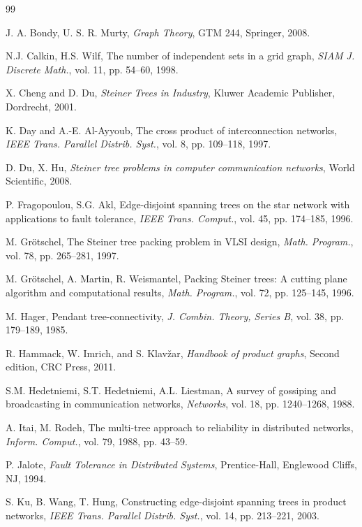 \documentclass[final]{dmtcs-episciences}
\begin{document}
\begin{thebibliography}{99}


J. A. Bondy, U. S. R. Murty, \emph{Graph Theory}, GTM 244, Springer,
2008.

N.J. Calkin, H.S. Wilf, The number of independent sets in a grid
graph, \emph{SIAM J. Discrete Math.}, vol. 11, pp. 54--60, 1998.

X. Cheng and D. Du, \emph{Steiner Trees in Industry}, Kluwer
Academic Publisher, Dordrecht, 2001.

K. Day and A.-E. Al-Ayyoub, The cross product of interconnection
networks, \emph{IEEE Trans. Parallel Distrib. Syst.}, vol. 8, pp.
109--118, 1997.

D. Du, X. Hu, \emph{Steiner tree problems in computer communication
networks}, World Scientific, 2008.

P. Fragopoulou, S.G. Akl, Edge-disjoint spanning trees on the star
network with applications to fault tolerance, \emph{IEEE Trans.
Comput.}, vol. 45, pp. 174--185, 1996.


M. Gr\"{o}tschel, The Steiner tree packing problem in VLSI design,
\emph{Math. Program.}, vol. 78, pp. 265--281, 1997.

M. Gr\"{o}tschel, A. Martin, R. Weismantel, Packing Steiner trees: A
cutting plane algorithm and computational results, \emph{Math.
Program.}, vol. 72, pp. 125--145, 1996.

M. Hager, Pendant tree-connectivity, \emph{J. Combin. Theory, Series B}, vol.
38, pp. 179--189, 1985.

R. Hammack, W. Imrich, and S. Klav\v{z}ar, \emph{Handbook of product
graphs}, Second edition, CRC Press, 2011.

S.M. Hedetniemi, S.T. Hedetniemi, A.L. Liestman, A survey of
gossiping and broadcasting in communication networks,
\emph{Networks}, vol. 18, pp. 1240--1268, 1988.

A. Itai, M. Rodeh, The multi-tree approach to reliability in
distributed networks, \emph{Inform. Comput.}, vol. 79, 1988, pp.
43--59.

P. Jalote, \emph{Fault Tolerance in Distributed Systems},
Prentice-Hall, Englewood Cliffs, NJ, 1994.


S. Ku, B. Wang, T. Hung, Constructing edge-disjoint spanning trees
in product networks, \emph{IEEE Trans. Parallel Distrib. Syst.}, vol.
14, pp. 213--221, 2003.


\end{thebibliography}
\end{document}
